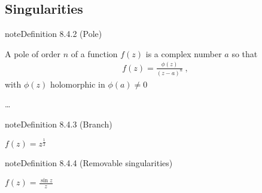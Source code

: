 \documentclass[letterpaper,10pt,english]{jupyterBook}
\begin{document}
\subsection{Singularities}
\label{\detokenize{ch/complex/analysis:singularities}}\label{\detokenize{ch/complex/analysis:complex-analysis-singularities}}\label{ch/complex/analysis:definition-2}
\begin{sphinxadmonition}{note}{Definition 8.4.2 (Pole)}



\sphinxAtStartPar
A pole of order \(n\) of a function \(f(z)\) is a complex number \(a\) so that
\begin{equation*}
\begin{split}f(z) = \frac{\phi(z)}{(z-a)^n} \ ,\end{split}
\end{equation*}
\sphinxAtStartPar
with \(\phi(z)\) holomorphic in \(\phi(a) \ne 0\)
\end{sphinxadmonition}

\sphinxAtStartPar
{} …
\label{ch/complex/analysis:definition-3}
\begin{sphinxadmonition}{note}{Definition 8.4.3 (Branch)}


\end{sphinxadmonition}

\sphinxAtStartPar
{} \(f(z) = z^{\frac{1}{2}}\)
\label{ch/complex/analysis:definition-4}
\begin{sphinxadmonition}{note}{Definition 8.4.4 (Removable singularities)}


\end{sphinxadmonition}

\sphinxAtStartPar
{} \(f(z) = \frac{\sin z}{z}\)

\sphinxAtStartPar
{}
\end{document}
